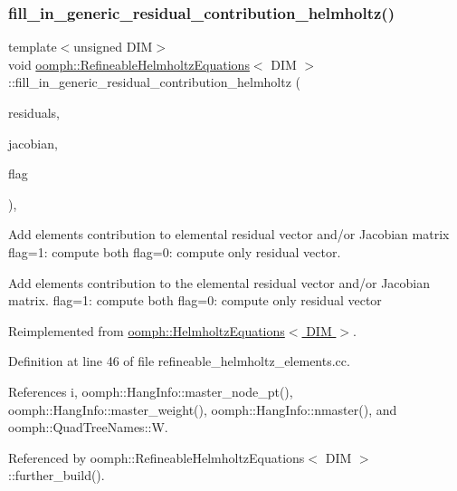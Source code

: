 \subsubsection{\texorpdfstring{fill\+\_\+in\+\_\+generic\+\_\+residual\+\_\+contribution\+\_\+helmholtz()}{fill\_in\_generic\_residual\_contribution\_helmholtz()}}
{\footnotesize\ttfamily template$<$unsigned D\+IM$>$ \\
void \hyperlink{classoomph_1_1RefineableHelmholtzEquations}{oomph\+::\+Refineable\+Helmholtz\+Equations}$<$ D\+IM $>$\+::fill\+\_\+in\+\_\+generic\+\_\+residual\+\_\+contribution\+\_\+helmholtz (\begin{DoxyParamCaption}\item[{\hyperlink{classoomph_1_1Vector}{Vector}$<$ double $>$ \&}]{residuals,  }\item[{\hyperlink{classoomph_1_1DenseMatrix}{Dense\+Matrix}$<$ double $>$ \&}]{jacobian,  }\item[{const unsigned \&}]{flag }\end{DoxyParamCaption})\hspace{0.3cm}{\ttfamily [private]}, {\ttfamily [virtual]}}



Add element\textquotesingle{}s contribution to elemental residual vector and/or Jacobian matrix flag=1\+: compute both flag=0\+: compute only residual vector. 

Add element\textquotesingle{}s contribution to the elemental residual vector and/or Jacobian matrix. flag=1\+: compute both flag=0\+: compute only residual vector 

Reimplemented from \hyperlink{classoomph_1_1HelmholtzEquations_a24fbdea32fd24f0cef97d34cf99c36a3}{oomph\+::\+Helmholtz\+Equations$<$ D\+I\+M $>$}.



Definition at line 46 of file refineable\+\_\+helmholtz\+\_\+elements.\+cc.



References i, oomph\+::\+Hang\+Info\+::master\+\_\+node\+\_\+pt(), oomph\+::\+Hang\+Info\+::master\+\_\+weight(), oomph\+::\+Hang\+Info\+::nmaster(), and oomph\+::\+Quad\+Tree\+Names\+::W.



Referenced by oomph\+::\+Refineable\+Helmholtz\+Equations$<$ D\+I\+M $>$\+::further\+\_\+build().

\mbox{\label{classoomph_1_1RefineableHelmholtzEquations_a6b58f755f6ab936ab633ecee05998899}} 
